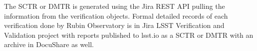 The SCTR or DMTR is generated using the Jira REST API pulling the information from the verification objects.
Formal detailed records of each verification done by Rubin Observatory is in Jira LSST Verification and Validation project with reports published to lsst.io as a SCTR or DMTR with an archive in DocuShare as well.
